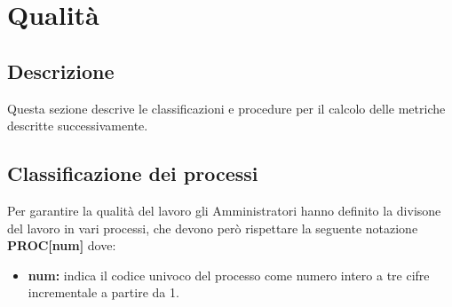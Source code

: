\documentclass[NormeDiProgetto.tex]{subfiles}
\begin{document}
	
	\section{Qualità}
	\subsection{Descrizione}
	Questa sezione descrive le classificazioni e procedure per il calcolo delle metriche descritte successivamente.
	\subsection{Classificazione dei processi}
	Per garantire la qualità del lavoro gli Amministratori hanno definito la divisone del lavoro in vari processi, che devono però rispettare la seguente notazione \textbf{PROC[num]}	dove:
	\begin{itemize}
		\item \textbf{num:} indica il codice univoco del processo come numero intero a tre cifre incrementale a partire da 1.
	\end{itemize}	
	
\end{document}
